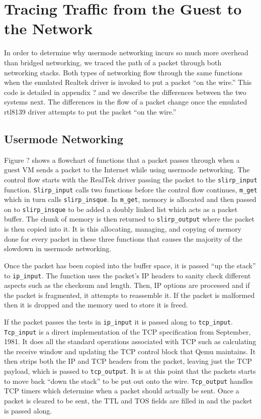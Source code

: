 \section{Tracing Traffic from the Guest to the Network}
\label{sec:trace}

In order to determine why usermode networking incurs so much more overhead than bridged networking, we traced the path of a packet through both networking stacks.
Both types of networking flow through the same functions when the emulated Realtek driver is invoked to put a packet ``on the wire.''
This code is detailed in appendix ? and we describe the differences between the two systems next.
The differences in the flow of a packet change once the emulated rtl8139 driver attempts to put the packet ``on the wire.''

\subsection{Usermode Networking}
\label{subsec:usermode}

Figure ? shows a flowchart of functions that a packet passes through when a guest VM sends a packet to the Internet while using usermode networking.
The control flow starts with the RealTek driver passing the packet to the \texttt{slirp_input} function.
\texttt{Slirp_input} calls two functions before the control flow continues, \texttt{m_get} which in turn calls \texttt{slirp_insque}.
In \texttt{m_get}, memory is allocated and then passed on to \texttt{slirp_insque} to be added a doubly linked list which acts as a packet buffer.
The chunk of memory is then returned to \texttt{slirp_output} where the packet is then copied into it. %
It is this allocating, managing, and copying of memory done for every packet in these three functions that causes the majority of the slowdown in usermode networking.

Once the packet has been copied into the buffer space, it is passed ``up the stack'' to \texttt{ip_input}. 
The function uses the packet's IP headers to sanity check different aspects such as the checksum and length.
Then, IP options are processed and if the packet is fragmented, it attempts to reassemble it.
If the packet is malformed then it is dropped and the memory used to store it is freed.

If the packet passes the tests in \texttt{ip_input} it is passed along to \texttt{tcp_input}.
\texttt{Tcp_input} is a direct implementation of the TCP specification from September, 1981.
It does all the standard operations associated with TCP such as calculating the receive window and updating the TCP control block that Qemu maintains.
It then strips both the IP and TCP headers from the packet, leaving just the TCP payload, which is passed to \texttt{tcp_output}.
It is at this point that the packets starts to move back ``down the stack'' to be put out onto the wire.
\texttt{Tcp_output} handles TCP timers which determine when a packet should actually be sent.
Once a packet is cleared to be sent, the TTL and TOS fields are filled in and the packet is passed along.

